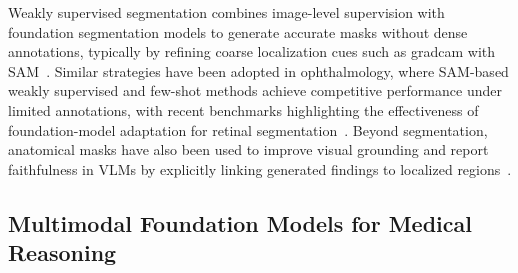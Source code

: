 \documentclass[runningheads]{llncs}
\begin{document}
Weakly supervised segmentation combines image-level supervision with foundation segmentation models to generate accurate masks without dense annotations, typically by refining coarse localization cues such as \gls{gradcam} with \gls{SAM}~\cite{wang2025weakmedsam}. Similar strategies have been adopted in ophthalmology, where \gls{SAM}-based weakly supervised and few-shot methods achieve competitive performance under limited annotations, with recent benchmarks highlighting the effectiveness of foundation-model adaptation for retinal segmentation~\cite{ibba2025weakly,cardenas2025fewshot,abreucardenas2025benchmark}. Beyond segmentation, anatomical masks have also been used to improve visual grounding and report faithfulness in \glspl{VLM} by explicitly linking generated findings to localized regions~\cite{jonske2025asarg}.

\subsection{Multimodal Foundation Models for Medical Reasoning}
\label{subsec:foundation}

\end{document}
